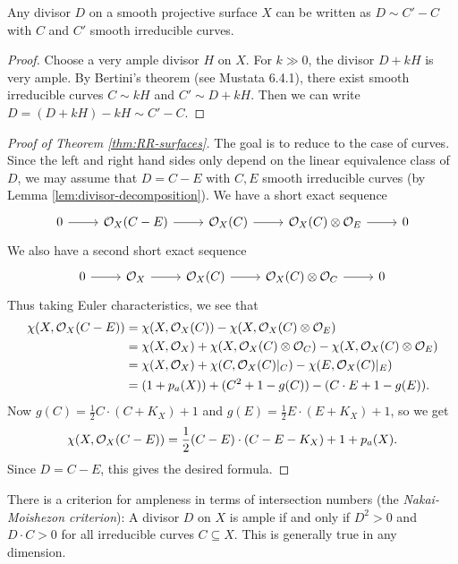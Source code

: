 \begin{lemma}\label{lem:divisor-decomposition}
  Any divisor $D$ on a smooth
  projective surface $X$ can be written
  as $D \sim C' - C$ with
  $C$ and $C'$ smooth irreducible curves.
\end{lemma}

\begin{proof}
  Choose a very ample divisor $H$ on $X$.
  For $k \gg 0$, the divisor
  $D + kH$ is very ample.
  By Bertini's theorem (see
  Mustata 6.4.1), there exist
  smooth irreducible curves
  $C \sim kH$ and $C' \sim D + kH$.
  Then we can write
  $D = (D + kH) - kH \sim C' - C$.
\end{proof}

\begin{proof}[Proof of Theorem \ref{thm:RR-surfaces}]
  The goal is to reduce to the case
  of curves.
  Since the left and right hand sides
  only depend on the linear equivalence class
  of $D$, we may assume that $D = C - E$ 
  with $C, E$ smooth irreducible curves
  (by Lemma \ref{lem:divisor-decomposition}).
  We have a short exact sequence
  \[
    \begin{tikzcd}
      0 \ar[r] & \OO_X(C - E)
      \ar[r] & \OO_X(C) \ar[r] & \OO_X(C) \otimes \OO_E
      \ar[r] & 0
    \end{tikzcd}
  \]
  We also have a second short exact sequence
  \[
    \begin{tikzcd}
      0 \ar[r]
      & \OO_X
      \ar[r] & \OO_X(C)
      \ar[r] & \OO_X(C) \otimes \OO_C
      \ar[r] & 0
    \end{tikzcd}
  \]
  \pagebreak
  Thus taking Euler characteristics, we see
  that
  \begin{align*}
    \chi(X, \mathcal{O}_X(C - E))
    &= \chi(X, \mathcal{O}_X(C))
    - \chi(X, \mathcal{O}_X(C) \otimes \mathcal{O}_E) \\
    &= \chi(X, \mathcal{O}_X)
    + \chi(X, \mathcal{O}_X(C) \otimes \mathcal{O}_C)
    - \chi(X, \mathcal{O}_X(C) \otimes \mathcal{O}_E) \\
    &= \chi(X, \mathcal{O}_X)
    + \chi(C, \mathcal{O}_X(C)|_C)
    - \chi(E, \mathcal{O}_X(C)|_E) \\
    &= (1 + p_a(X))
    + (C^2 + 1 - g(C))
    - (C \cdot E + 1 - g(E)).
  \end{align*}
  Now
  $g(C) = \frac{1}{2} C \cdot (C + K_X) + 1$
  and $g(E) = \frac{1}{2} E \cdot (E + K_X) + 1$,
  so we get
  \[
    \chi(X, \mathcal{O}_X(C - E))
    = \frac{1}{2}(C - E) \cdot (C - E - K_X)
    + 1 + p_a(X).
  \]
  Since $D = C - E$, this gives the
  desired formula.
\end{proof}

\begin{remark}
  There is a criterion for ampleness
  in terms of intersection numbers
  (the \emph{Nakai-Moishezon criterion}):
  A divisor $D$ on $X$ is ample
  if and only if $D^2 > 0$ and
  $D \cdot C > 0$ for all irreducible
  curves $C \subseteq X$. This is
  generally true in any dimension.
\end{remark}
